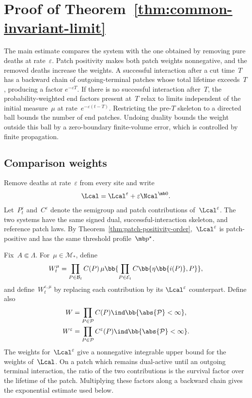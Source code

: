 \section{Proof of Theorem~\ref{thm:common-invariant-limit}}
\label{sec:convergence}

The main estimate compares the system with the one obtained by removing pure
deaths at rate~$\varepsilon$. Patch positivity makes both patch weights
nonnegative, and the removed deaths increase the weights. A
successful interaction after a cut time~$T$ has a backward chain of
outgoing-terminal patches whose total lifetime exceeds~$T$, producing a factor
$e^{-\varepsilon T}$. If there is no successful interaction after~$T$, the
probability-weighted end factors present at~$T$ relax to limits independent of
the initial measure~$\mu$ at rate~$e^{-\varepsilon(t-T)}$. Restricting the
pre-$T$ skeleton to a directed ball bounds the number of end patches. Undoing
duality bounds the weight outside this ball by a zero-boundary finite-volume
error, which is controlled by finite propagation.

\subsection{Comparison weights}
\label{subsec:positive-skeleton-weights}

Remove deaths at rate~$\varepsilon$ from every site and write
\begin{equation}
\label{eq:uniform-death-decomposition}
\Lcal
=
\Lcal^\varepsilon
+
\varepsilon\Ncal^{\mb 0}.
\end{equation}
Let~$P_t^\varepsilon$ and~$C^\varepsilon$ denote the semigroup and patch
contributions of~$\Lcal^\varepsilon$. The two systems have the same signed dual,
successful-interaction skeleton, and reference patch laws. By
Theorem~\ref{thm:patch-positivity-order},~$\Lcal^\varepsilon$ is patch-positive
and has the same threshold profile~$\mb p^\star$.

Fix~$A\Subset\Lambda$. For~$\mu\in\mathcal M_*$, define
\begin{equation}
\label{eq:finite-horizon-weight}
W_t^\mu
=
\prod_{P\in\mathcal B_t}C(P)\,
\mu\bb{
 \prod_{P\in\mathcal E_t}
 C\bb{\eta\bb{i(P)},P}
},
\end{equation}
and define~$W_t^{\varepsilon,\mu}$ by replacing each contribution by its
$\Lcal^\varepsilon$ counterpart. Define also
\begin{align*}
W
&=
\prod_{P\in\mathcal P}C(P)
\ind\bb{\abs{\mathcal P}<\infty},
\\
W^\varepsilon
&=
\prod_{P\in\mathcal P}C^\varepsilon(P)
\ind\bb{\abs{\mathcal P}<\infty}.
\end{align*}
The weights for~$\Lcal^\varepsilon$ give a nonnegative integrable upper bound
for the weights of~$\Lcal$. On a patch which remains dual-active until an
outgoing terminal interaction, the ratio of the two contributions is the
survival factor over the lifetime of the patch. Multiplying these factors along
a backward chain gives the exponential estimate used below.

